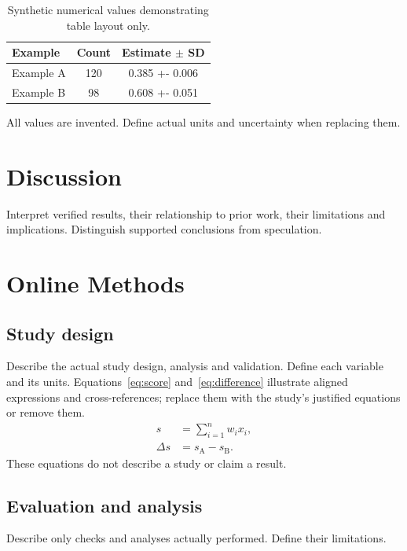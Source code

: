 \documentclass[11pt]{article}
\begin{document}
\begin{table}[htbp]
\centering\small
\caption{Synthetic numerical values demonstrating table layout only.}
\label{tab:comparison}
\begin{tabularx}{\linewidth}{@{}>{\raggedright\arraybackslash}X
 S[table-format=3.0] S[table-format=1.3(3)]@{}}
\toprule
Example & {Count} & {Estimate $\pm$ SD}\\
\midrule
Example A & 120 & 0.385 +- 0.006\\
Example B & 98 & 0.608 +- 0.051\\
\bottomrule
\end{tabularx}
\par\smallskip\footnotesize\raggedright
All values are invented. Define actual units and uncertainty when replacing them.
\end{table}

\section{Discussion}\label{sec:discussion}
Interpret verified results, their relationship to prior work, their limitations
and implications. Distinguish supported conclusions from speculation.

\section{Online Methods}\label{sec:methods}
\subsection{Study design}
Describe the actual study design, analysis and validation. Define each variable and its units. Equations~\eqref{eq:score}
and~\eqref{eq:difference} illustrate aligned expressions and cross-references;
replace them with the study's justified equations or remove them.
\begin{align}
 s &= \sum_{i=1}^{n} w_i x_i,\label{eq:score}\\
 \Delta s &= s_{\mathrm{A}}-s_{\mathrm{B}}.\label{eq:difference}
\end{align}
These equations do not describe a study or claim a result.

\subsection{Evaluation and analysis}
Describe only checks and analyses actually performed. Define their limitations.
\end{document}
